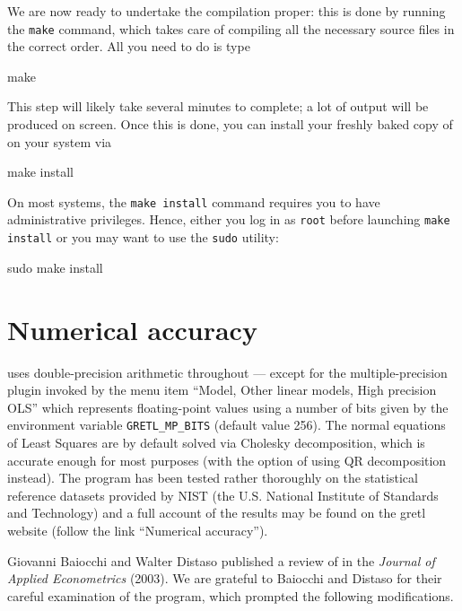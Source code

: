 We are now ready to undertake the compilation proper: this is done by
running the \texttt{make} command, which takes care of compiling all
the necessary source files in the correct order. All you need to do is
type
\begin{code}
make 
\end{code}

This step will likely take several minutes to complete; a lot of
output will be produced on screen. Once this is done, you can install
your freshly baked copy of  on your system via
\begin{code}
make install
\end{code}

On most systems, the \texttt{make install} command requires you to
have administrative privileges.  Hence, either you log in as
\texttt{root} before launching \texttt{make install} or you may want
to use the \texttt{sudo} utility:
\begin{code}
sudo make install
\end{code}


\chapter{Numerical accuracy}
\label{app-accuracy}

 uses double-precision arithmetic throughout --- except for
the multiple-precision plugin invoked by the menu item ``Model, Other
linear models, High precision OLS'' which represents floating-point
values using a number of bits given by the environment variable
\verb+GRETL_MP_BITS+ (default value 256).  The normal equations of
Least Squares are by default solved via Cholesky decomposition, which
is accurate enough for most purposes (with the option of using QR
decomposition instead).  The program has been tested rather thoroughly
on the statistical reference datasets provided by NIST (the U.S.
National Institute of Standards and Technology) and a full account of
the results may be found on the gretl website (follow the link
``Numerical accuracy'').

Giovanni Baiocchi and Walter Distaso published a review of 
in the \emph{Journal of Applied Econometrics} (2003).  We are grateful
to Baiocchi and Distaso for their careful examination of the program,
which prompted the following modifications.

